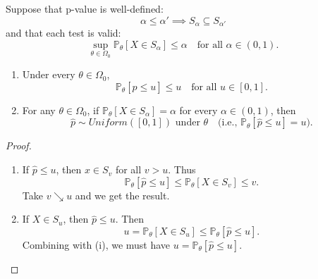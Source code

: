 \documentclass[a4paper]{article}
\begin{document}
\begin{prop}
	Suppose that p-value is well-defined:
	\begin{equation}
		\alpha \leq \alpha' \implies S_{\alpha} \subseteq S_{\alpha'}
	\end{equation}
	and that each test is valid:
	\begin{equation}
		\sup\limits_{\theta \in \Omega_0} \mathbb{P}_\theta[X \in S_{\alpha}] \leq \alpha \quad \text{for all $\alpha \in (0,1)$.}
	\end{equation}
	\begin{enumerate}
		\item Under every $\theta \in \Omega_0$,
		\begin{equation}
			\mathbb{P}_\theta[\hat{p} \leq u] \leq u \quad \text{for all $u \in [0,1]$.}
		\end{equation}
		\item For any $\theta \in \Omega_0$, if $\mathbb{P}_\theta[X \in S_{\alpha}] = \alpha$ for every $\alpha \in (0,1)$, then
		\begin{equation}
			\hat{p} \sim Uniform([0,1]) \text{ under } \theta \quad \text{(i.e., $\mathbb{P}_{\theta}[\hat{p} \leq u] = u$).}
		\end{equation}
		
	\end{enumerate}
\end{prop}

\begin{proof}
	\quad
	\begin{enumerate}
		\item If $\hat{p} \leq u$, then $x \in S_v$ for all $v > u$. Thus
		\begin{equation}
			\mathbb{P}_{\theta}[\hat{p} \leq u] \leq \mathbb{P}_{\theta}[X \in S_v] \leq v.
		\end{equation}
		Take $v \searrow u$ and we get the result.
		\item If $X \in S_u$, then $\hat{p} \leq u$. Then
		\begin{equation}
			u = \mathbb{P}_\theta[X \in S_{u}] \leq \mathbb{P}_\theta[\hat{p} \leq u].
		\end{equation}
		Combining with (i), we must have $u = \mathbb{P}_\theta[\hat{p} \leq u]$.
	\end{enumerate}
\end{proof}
\end{document}
